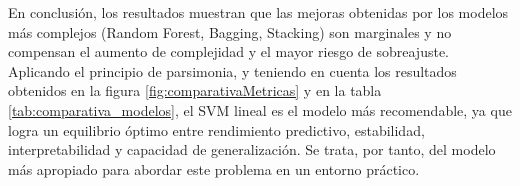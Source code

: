 \documentclass[a4paper,onecolumn]{extarticle}
\let\stdsection\section
\renewcommand\section{\newpage\stdsection}
\begin{document}
\begin{sloppypar}
En conclusión, los resultados muestran que las mejoras obtenidas por los modelos más complejos (Random Forest, Bagging, Stacking) son marginales y no compensan el aumento
de complejidad y el mayor riesgo de sobreajuste. Aplicando el principio de parsimonia, y teniendo en cuenta los resultados obtenidos en la figura \ref{fig:comparativaMetricas} 
y en la tabla \ref{tab:comparativa_modelos}, el SVM lineal es el modelo más recomendable, ya que logra un equilibrio óptimo entre rendimiento predictivo, estabilidad, 
interpretabilidad y capacidad de generalización. Se trata, por tanto, del modelo más apropiado para abordar este problema en un entorno práctico.

\clearpage

%
\end{sloppypar}
\end{document}
